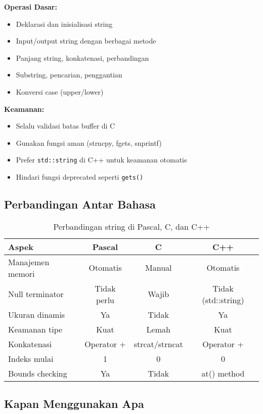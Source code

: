 \documentclass[../main.tex]{subfiles}
\begin{document}
\textbf{Operasi Dasar:}
\begin{itemize}
  \item Deklarasi dan inisialisasi string
  \item Input/output string dengan berbagai metode
  \item Panjang string, konkatenasi, perbandingan
  \item Substring, pencarian, penggantian
  \item Konversi case (upper/lower)
\end{itemize}

\textbf{Keamanan:}
\begin{itemize}
  \item Selalu validasi batas buffer di C
  \item Gunakan fungsi aman (strncpy, fgets, snprintf)
  \item Prefer \texttt{std::string} di C++ untuk keamanan otomatis
  \item Hindari fungsi deprecated seperti \texttt{gets()}
\end{itemize}

\subsection{Perbandingan Antar Bahasa}

\begin{table}[H]
\centering
\begin{tabular}{|l|c|c|c|}
\hline
\textbf{Aspek} & \textbf{Pascal} & \textbf{C} & \textbf{C++} \\
\hline
Manajemen memori & Otomatis & Manual & Otomatis \\
\hline
Null terminator & Tidak perlu & Wajib & Tidak (std::string) \\
\hline
Ukuran dinamis & Ya & Tidak & Ya \\
\hline
Keamanan tipe & Kuat & Lemah & Kuat \\
\hline
Konkatenasi & Operator + & strcat/strncat & Operator + \\
\hline
Indeks mulai & 1 & 0 & 0 \\
\hline
Bounds checking & Ya & Tidak & at() method \\
\hline
\end{tabular}
\caption{Perbandingan string di Pascal, C, dan C++}
\end{table}

\subsection{Kapan Menggunakan Apa}
\end{document}
